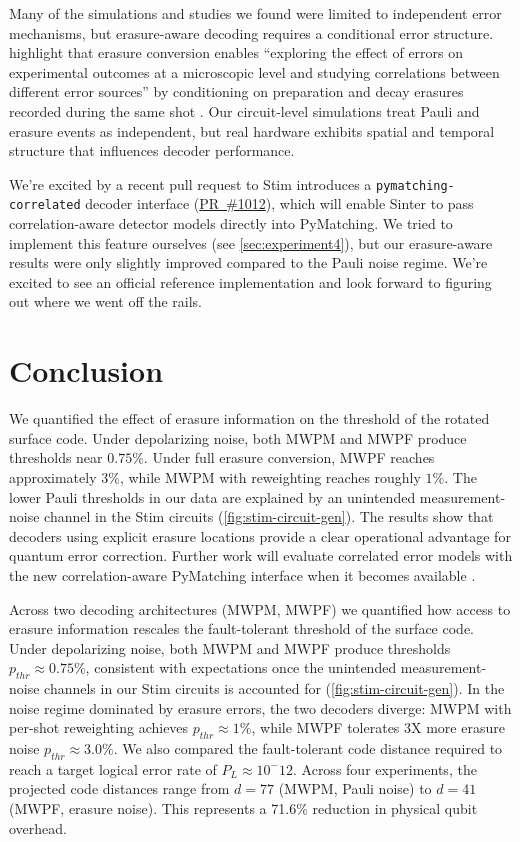 \documentclass[11pt, notitlepage, letterpaper]{article}
\begin{document}
Many of the simulations and studies we found were limited to independent error mechanisms, but erasure-aware decoding requires a conditional error structure. \citeauthor{scholl_erasure_2023} highlight that erasure conversion enables ``exploring the effect of errors on experimental outcomes at a microscopic level and studying correlations between different error sources'' by conditioning on preparation and decay erasures recorded during the same shot \cite{scholl_erasure_2023}. Our circuit-level simulations treat Pauli and erasure events as independent, but real hardware exhibits spatial and temporal structure that influences decoder performance.

We're excited by a recent pull request to Stim introduces a \texttt{pymatching-correlated} decoder interface (\href{https://github.com/quantumlib/Stim/pull/1012}{PR~\#1012}), which will enable Sinter to pass correlation-aware detector models directly into PyMatching. We tried to implement this feature ourselves (see \autoref{sec:experiment4}), but our erasure-aware results were only slightly improved compared to the Pauli noise regime. We're excited to see an official reference implementation and look forward to figuring out where we went off the rails.


\section{Conclusion}

We quantified the effect of erasure information on the threshold of the rotated surface code. Under depolarizing noise, both MWPM and MWPF produce thresholds near $0.75\%$. Under full erasure conversion, MWPF reaches approximately $3\%$, while MWPM with reweighting reaches roughly $1\%$. The lower Pauli thresholds in our data are explained by an unintended measurement-noise channel in the Stim circuits (\autoref{fig:stim-circuit-gen}). The results show that decoders using explicit erasure locations provide a clear operational advantage for quantum error correction. Further work will evaluate correlated error models with the new correlation-aware PyMatching interface when it becomes available \cite{oscarhiggott_oscarhiggottpymatching_2025}.

Across two decoding architectures (MWPM, MWPF) we quantified how access to erasure information rescales the fault-tolerant threshold of the surface code. Under depolarizing noise, both MWPM and MWPF produce thresholds $p_{thr} \approx 0.75\%$, consistent with expectations once the unintended measurement-noise channels in our Stim circuits is accounted for (\autoref{fig:stim-circuit-gen}). In the noise regime dominated by erasure errors, the two decoders diverge: MWPM with per-shot reweighting achieves $p_{thr} \approx 1\%$, while MWPF tolerates 3X more erasure noise $p_{thr} \approx 3.0\%$. We also compared the fault-tolerant code distance required to reach a target logical error rate of $P_L \approx 10^-12$. Across four experiments, the projected code distances range from $d=77$ (MWPM, Pauli noise) to $d=41$ (MWPF, erasure noise). This represents a 71.6\% reduction in physical qubit overhead.
\end{document}
